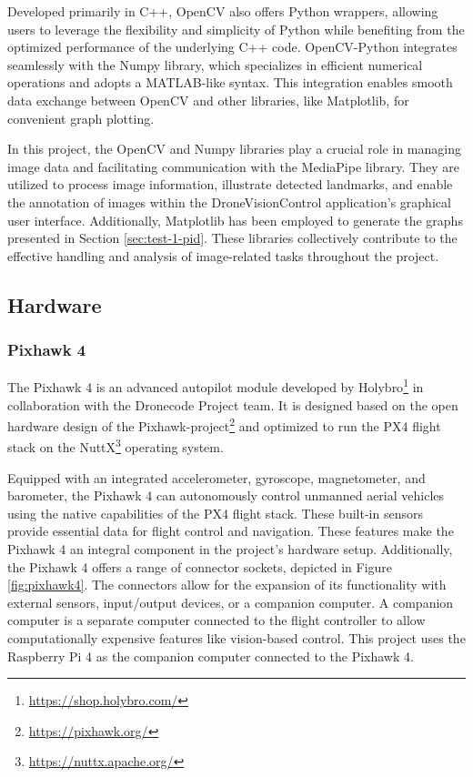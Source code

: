 Developed primarily in C++, OpenCV also offers Python wrappers, allowing users to leverage the flexibility and simplicity of Python while benefiting from the optimized performance of the underlying C++ code. OpenCV-Python integrates seamlessly with the Numpy library, which specializes in efficient numerical operations and adopts a MATLAB-like syntax. This integration enables smooth data exchange between OpenCV and other libraries, like Matplotlib, for convenient graph plotting.

In this project, the OpenCV and Numpy libraries play a crucial role in managing image data and facilitating communication with the MediaPipe library. They are utilized to process image information, illustrate detected landmarks, and enable the annotation of images within the DroneVisionControl application's graphical user interface. Additionally, Matplotlib has been employed to generate the graphs presented in Section \ref{sec:test-1-pid}. These libraries collectively contribute to the effective handling and analysis of image-related tasks throughout the project.

\subsection{Hardware}
\subsubsection{Pixhawk 4}
\label{subsec:pixhawk}

The Pixhawk 4 is an advanced autopilot module developed by Holybro\footnote{\url{https://shop.holybro.com/}} in collaboration with the Dronecode Project team. It is designed based on the open hardware design of the Pixhawk-project\footnote{\url{https://pixhawk.org/}} and optimized to run the PX4 flight stack on the NuttX\footnote{\url{https://nuttx.apache.org/}} operating system.

Equipped with an integrated accelerometer, gyroscope, magnetometer, and barometer, the Pixhawk 4 can autonomously control unmanned aerial vehicles using the native capabilities of the PX4 flight stack. These built-in sensors provide essential data for flight control and navigation.
These features make the Pixhawk 4 an integral component in the project's hardware setup.
Additionally, the Pixhawk 4 offers a range of connector sockets, depicted in Figure \ref{fig:pixhawk4}. The connectors allow for the expansion of its functionality with external sensors, input/output devices, or a companion computer. A companion computer is a separate computer connected to the flight controller to allow computationally expensive features like vision-based control. This project uses the Raspberry Pi 4 as the companion computer connected to the Pixhawk 4.


